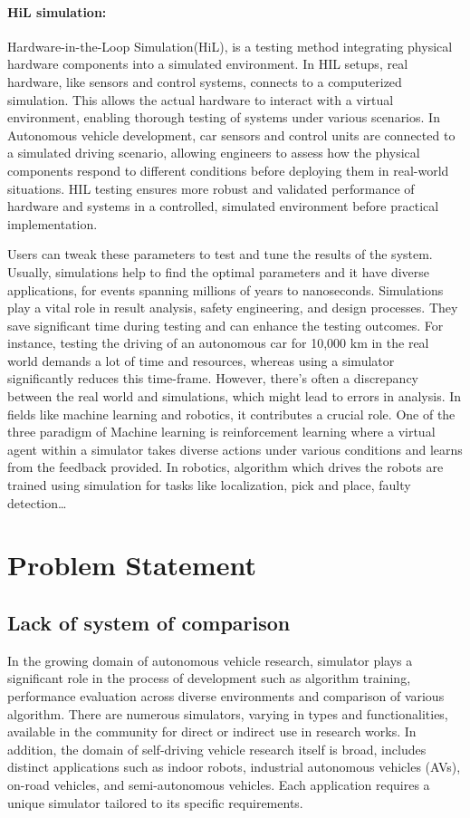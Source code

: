 \documentclass[12pt,twoside,a4paper,parskip]{scrbook} %
\begin{document}
\paragraph*{HiL simulation:} Hardware-in-the-Loop Simulation(HiL), is a testing method integrating physical hardware components into a simulated environment. In HIL setups, real hardware, like sensors and control systems, connects to a computerized simulation. This allows the actual hardware to interact with a virtual environment, enabling thorough testing of systems under various scenarios. In Autonomous vehicle development, car sensors and control units are connected to a simulated driving scenario, allowing engineers to assess how the physical components respond to different conditions before deploying them in real-world situations. HIL testing ensures more robust and validated performance of hardware and systems in a controlled, simulated environment before practical implementation.

Users can tweak these parameters to test and tune the results of the system. Usually, simulations help to find the optimal parameters and it have diverse applications, for events spanning millions of years to nanoseconds. Simulations play a vital role in result analysis, safety engineering, and design processes. They save significant time during testing and can enhance the testing outcomes. For instance, testing the driving of an autonomous car for 10,000 km in the real world demands a lot of time and resources, whereas using a simulator significantly reduces this time-frame. However, there's often a discrepancy between the real world and simulations, which might lead to errors in analysis. In fields like machine learning and robotics, it contributes a crucial role. One of the three paradigm of Machine learning is reinforcement learning where a virtual agent within a simulator takes diverse actions under various conditions and learns from the feedback provided. In robotics, algorithm which drives the robots are trained using simulation for tasks like localization, pick and place, faulty detection…
\section{Problem Statement}
\subsection{Lack of system of comparison}
In the growing domain of autonomous vehicle research, simulator plays a significant role in the process of development such as algorithm training, performance evaluation across diverse environments and comparison of various algorithm. There are numerous simulators, varying in types and functionalities, available in the community for direct or indirect use in research works. In addition, the domain of self-driving vehicle research itself is broad, includes distinct applications such as indoor robots, industrial autonomous vehicles (AVs), on-road vehicles, and semi-autonomous vehicles. Each application requires a unique simulator tailored to its specific requirements.
\end{document}
